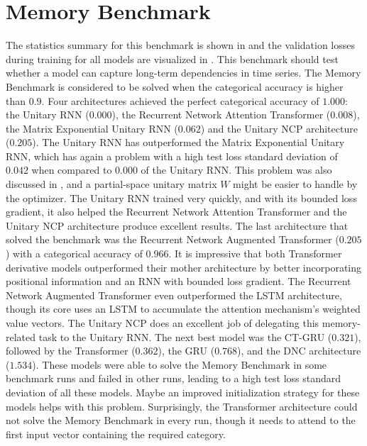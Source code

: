 \documentclass[draft,final]{vutinfth} %
\begin{document}
    \section{Memory Benchmark} \label{memory_results}
    The statistics summary for this benchmark is shown in  and the validation losses during training for all models are visualized in .
    This benchmark should test whether a model can capture long-term dependencies in time series.
    The Memory Benchmark is considered to be solved when the categorical accuracy is higher than $0.9$.
    Four architectures achieved the perfect categorical accuracy of $1.000$: the Unitary RNN ($0.000$), the Recurrent Network Attention Transformer ($0.008$), the Matrix Exponential Unitary RNN ($0.062$) and the Unitary NCP architecture ($0.205$).
    The Unitary RNN has outperformed the Matrix Exponential Unitary RNN, which has again a problem with a high test loss standard deviation of $0.042$ when compared to $0.000$ of the Unitary RNN.
    This problem was also discussed in , and a partial-space unitary matrix $W$ might be easier to handle by the optimizer.
    The Unitary RNN trained very quickly, and with its bounded loss gradient, it also helped the Recurrent Network Attention Transformer and the Unitary NCP architecture produce excellent results.
    The last architecture that solved the benchmark was the Recurrent Network Augmented Transformer ($0.205$) with a categorical accuracy of $0.966$.
    It is impressive that both Transformer derivative models outperformed their mother architecture by better incorporating positional information and an RNN with bounded loss gradient.
    The Recurrent Network Augmented Transformer even outperformed the LSTM architecture, though its core uses an LSTM to accumulate the attention mechanism's weighted value vectors.
    The Unitary NCP does an excellent job of delegating this memory-related task to the Unitary RNN.
    The next best model was the CT-GRU ($0.321$), followed by the Transformer ($0.362$), the GRU ($0.768$), and the DNC architecture ($1.534$).
    These models were able to solve the Memory Benchmark in some benchmark runs and failed in other runs, leading to a high test loss standard deviation of all these models.
    Maybe an improved initialization strategy for these models helps with this problem.
    Surprisingly, the Transformer architecture could not solve the Memory Benchmark in every run, though it needs to attend to the first input vector containing the required category.
\end{document}

